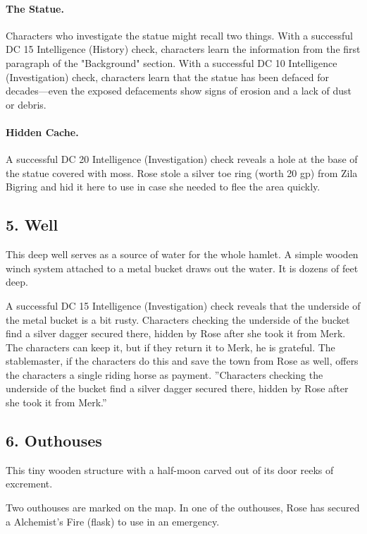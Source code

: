 \documentclass[10pt,a4paper,twoside,twocolumn,openany,bg=print,nodeprecatedcode]{dndbook}
\begin{document}
\paragraph{The Statue.}
Characters who investigate the statue might recall two things. With a successful DC 15 Intelligence (History) check, characters learn the information from the first paragraph of the "Background" section. With a successful DC 10 Intelligence (Investigation) check, characters learn that the statue has been defaced for decades—even the exposed defacements show signs of erosion and a lack of dust or debris.
\paragraph{Hidden Cache.}
A successful DC 20 Intelligence (Investigation) check reveals a hole at the base of the statue covered with moss. Rose stole a silver toe ring (worth 20 gp) from Zila Bigring and hid it here to use in case she needed to flee the area quickly.
\subsection{5. Well}
\begin{DndReadAloud}{}
This deep well serves as a source of water for the whole hamlet. A simple wooden winch system attached to a metal bucket draws out the water. It is dozens of feet deep.
\end{DndReadAloud}

A successful DC 15 Intelligence (Investigation) check reveals that the underside of the metal bucket is a bit rusty. Characters checking the underside of the bucket find a silver dagger secured there, hidden by Rose after she took it from Merk. The characters can keep it, but if they return it to Merk, he is grateful. The stablemaster, if the characters do this and save the town from Rose as well, offers the characters a single riding horse as payment.
\DndQuote%
{}
{''Characters checking the underside of the bucket find a silver dagger secured there, hidden by Rose after she took it from Merk.''}
{}
\subsection{6. Outhouses}
\begin{DndReadAloud}{}
This tiny wooden structure with a half-moon carved out of its door reeks of excrement.
\end{DndReadAloud}

Two outhouses are marked on the map. In one of the outhouses, Rose has secured a Alchemist's Fire (flask) to use in an emergency.
\end{document}
